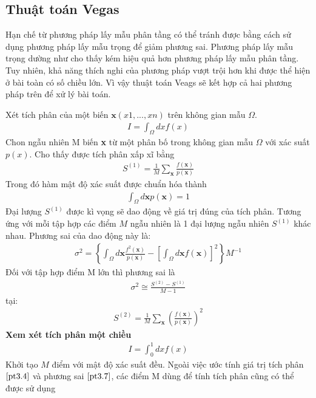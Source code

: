 \subsection{Thuật toán Vegas}\label{subsec:3.2.3}
Hạn chế từ phương pháp lấy mẫu phân tầng có thể tránh được bằng cách sử dụng phương pháp lấy mẫu trọng để giảm phương sai. 
Phương pháp lấy mẫu trọng dường như cho thấy kém hiệu quả hơn phương pháp lấy mẫu phân tầng. 
Tuy nhiên, khả năng thích nghi của phương pháp vượt trội hơn khi được thể hiện ở bài toàn có số chiều lớn. 
Vì vậy thuật toán Veags sẽ kết hợp cả hai phương pháp trên để xử lý bài toán.\par
Xét tích phân của một biến $\textbf{x}(x1,...,xn)$ trên không gian mẫu $\Omega$.
\begin{align}
      I=\int_\Omega{dxf(x)}
  \end{align}
  Chon ngẫu nhiên M biến \textbf{x} từ một phân bố trong không gian mẫu $\Omega$ với xác suất $p(x)$. Cho thấy được tích phân xấp xĩ bằng
  \begin{align}
      S^{(1)}={\frac{1}{M}}{\sum_\textbf{x}{\frac{f(\textbf{x})}{p(\textbf{x})}}}\label{pt3.4}
  \end{align}
Trong đó hàm mật độ xác suất được chuẩn hóa thành
\begin{align}
      \int_{\Omega}{d\textbf{x}p(\textbf{x})}=1
\end{align}
Đại lượng $S^{(1)}$ được kì vọng sẽ dao động về giá trị đúng của tích phân. Tương ứng với mỗi tập hợp các điểm $M$ ngẫu nhiên là 1 đại lượng ngẫu nhiên $S^{(1)}$ khác nhau. 
Phương sai của dao động này là:
\begin{align}
      \sigma^2=\left\{\int_{\Omega}d\textbf{x}\frac{f^2(\textbf{x})}{p(\textbf{x})}-\left[\int_{\Omega}d\textbf{x}f(\textbf{x})\right]^2\right\}M^{-1}\label{pt3.7}
\end{align}
Đối với tập hợp điểm M lớn thì phương sai là
\begin{align}
      \sigma^2\cong\frac{S^{(2)}-S^{(1)}}{M-1}\label{pt3.7}
\end{align}
tại: 
\begin{align}
      S^{(2)}=\frac{1}{M}{\sum_\textbf{x}}\left(\frac{f(\textbf{x})}{p(\textbf{x})}\right)^2
\end{align}
\textbf{Xem xét tích phân một chiều }\\
\begin{align}
      I=\int_0^1{dxf(x)}
\end{align}
Khởi tạo $M$ điểm với mật độ xác suất đều. Ngoài việc ước tính giá trị tích phân $ \ref{pt3.4} $ và phương sai $ \ref{pt3.7} $, các điểm M dùng để tính tích phân cũng có thể được sử dụng 
